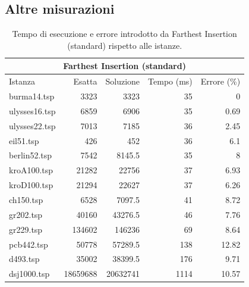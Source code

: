 \subsection{Altre misurazioni}

\begin{table}[h!]
    \centering

    \begin{tabular}{lrrrr}
    \toprule
    \multicolumn{5}{c}{Farthest Insertion (standard)} \\
    \hline
     Istanza       &   Esatta &        Soluzione &   Tempo (ms) &   Errore (\%) \\
    \hline
 burma14.tsp   &     3323 &   3323           &           35 &         0    \\
 ulysses16.tsp &     6859 &   6906           &           35 &         0.69 \\
 ulysses22.tsp &     7013 &   7185           &           36 &         2.45 \\
 eil51.tsp     &      426 &    452           &           36 &         6.1  \\
 berlin52.tsp  &     7542 &   8145.5         &           35 &         8    \\
 kroA100.tsp   &    21282 &  22756           &           37 &         6.93 \\
 kroD100.tsp   &    21294 &  22627           &           37 &         6.26 \\
 ch150.tsp     &     6528 &   7097.5         &           41 &         8.72 \\
 gr202.tsp     &    40160 &  43276.5         &           46 &         7.76 \\
 gr229.tsp     &   134602 & 146236           &           69 &         8.64 \\
 pcb442.tsp    &    50778 &  57289.5         &          138 &        12.82 \\
 d493.tsp      &    35002 &  38399.5         &          176 &         9.71 \\
 dsj1000.tsp   & 18659688 &   20632741 &         1114 &        10.57 \\
    \bottomrule
    \end{tabular}

    \caption{Tempo di esecuzione e errore introdotto da Farthest Insertion (standard) rispetto alle istanze.}
    \label{table:farthest-insertion-runtime-accuracy}
\end{table}


